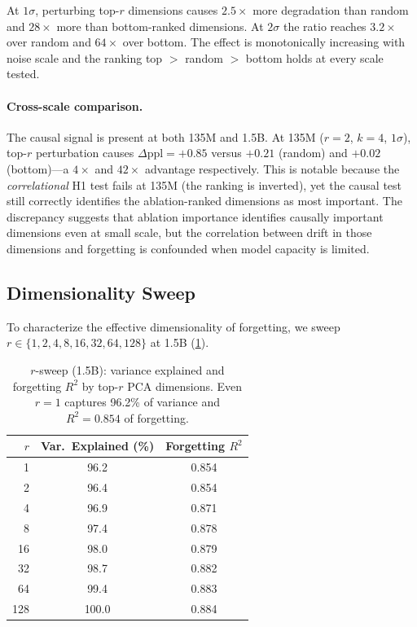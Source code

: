 At $1\sigma$, perturbing top-$r$ dimensions causes $2.5\times$ more degradation than random and $28\times$ more than bottom-ranked dimensions.
At $2\sigma$ the ratio reaches $3.2\times$ over random and $64\times$ over bottom.
The effect is monotonically increasing with noise scale and the ranking top $>$ random $>$ bottom holds at every scale tested.

\paragraph{Cross-scale comparison.}
The causal signal is present at both 135M and 1.5B.
At 135M ($r = 2$, $k = 4$, $1\sigma$), top-$r$ perturbation causes $\Delta\text{ppl} = +0.85$ versus $+0.21$ (random) and $+0.02$ (bottom)---a $4\times$ and $42\times$ advantage respectively.
This is notable because the \emph{correlational} H1 test fails at 135M (the ranking is inverted), yet the causal test still correctly identifies the ablation-ranked dimensions as most important.
The discrepancy suggests that ablation importance identifies causally important dimensions even at small scale, but the correlation between drift in those dimensions and forgetting is confounded when model capacity is limited.

\subsection{Dimensionality Sweep}
\label{sec:rsweep}

To characterize the effective dimensionality of forgetting, we sweep $r \in \{1, 2, 4, 8, 16, 32, 64, 128\}$ at 1.5B (\cref{tab:rsweep}).

\begin{table}[t]
\centering
\caption{$r$-sweep (1.5B): variance explained and forgetting $R^2$ by top-$r$ PCA dimensions. Even $r = 1$ captures 96.2\% of variance and $R^2 = 0.854$ of forgetting.}
\label{tab:rsweep}
\begin{tabular}{rcc}
\toprule
$r$ & Var.\ Explained (\%) & Forgetting $R^2$ \\
\midrule
1   & 96.2 & 0.854 \\
2   & 96.4 & 0.854 \\
4   & 96.9 & 0.871 \\
8   & 97.4 & 0.878 \\
16  & 98.0 & 0.879 \\
32  & 98.7 & 0.882 \\
64  & 99.4 & 0.883 \\
128 & 100.0 & 0.884 \\
\bottomrule
\end{tabular}
\end{table}

